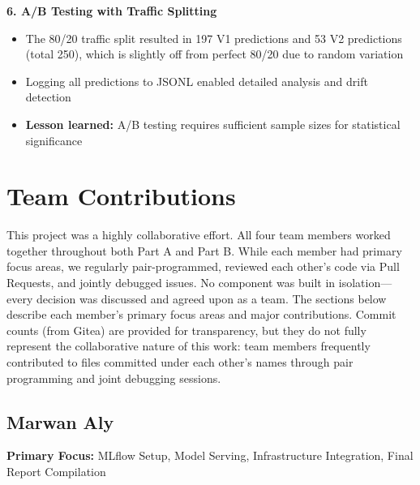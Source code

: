 \documentclass[11pt,a4paper]{article}
\begin{document}
\textbf{6. A/B Testing with Traffic Splitting}
\begin{itemize}
\item The 80/20 traffic split resulted in 197 V1 predictions and 53 V2 predictions (total 250), which is slightly off from perfect 80/20 due to random variation
\item Logging all predictions to JSONL enabled detailed analysis and drift detection
\item \textbf{Lesson learned:} A/B testing requires sufficient sample sizes for statistical significance
\end{itemize}

\newpage

\section{Team Contributions}
\label{sec:contributions}

This project was a highly collaborative effort. All four team members worked together throughout both Part A and Part B. While each member had primary focus areas, we regularly pair-programmed, reviewed each other's code via Pull Requests, and jointly debugged issues. No component was built in isolation—every decision was discussed and agreed upon as a team. The sections below describe each member's primary focus areas and major contributions. Commit counts (from Gitea) are provided for transparency, but they do not fully represent the collaborative nature of this work: team members frequently contributed to files committed under each other's names through pair programming and joint debugging sessions.

\subsection{Marwan Aly}

\textbf{Primary Focus:} MLflow Setup, Model Serving, Infrastructure Integration, Final Report Compilation
\end{document}
